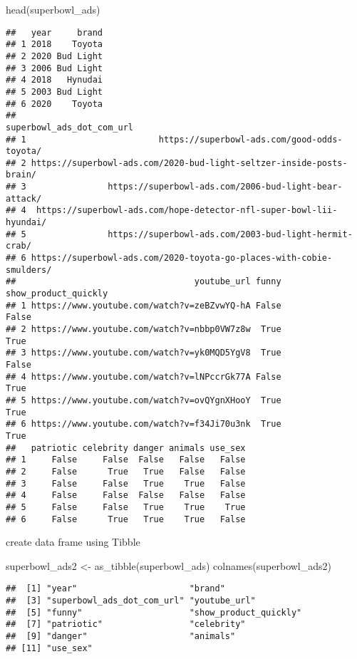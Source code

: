 \documentclass[
]{article}
\newenvironment{Shaded}{\begin{snugshade}}{\end{snugshade}}
\newcommand{\FunctionTok}[1]{\textcolor[rgb]{0.00,0.00,0.00}{#1}}
\newcommand{\NormalTok}[1]{#1}
\newcommand{\OtherTok}[1]{\textcolor[rgb]{0.56,0.35,0.01}{#1}}
\begin{document}
\begin{Shaded}
\begin{Highlighting}[]
\FunctionTok{head}\NormalTok{(superbowl\_ads)}
\end{Highlighting}
\end{Shaded}

\begin{verbatim}
##   year     brand
## 1 2018    Toyota
## 2 2020 Bud Light
## 3 2006 Bud Light
## 4 2018   Hynudai
## 5 2003 Bud Light
## 6 2020    Toyota
##                                              superbowl_ads_dot_com_url
## 1                          https://superbowl-ads.com/good-odds-toyota/
## 2 https://superbowl-ads.com/2020-bud-light-seltzer-inside-posts-brain/
## 3                https://superbowl-ads.com/2006-bud-light-bear-attack/
## 4  https://superbowl-ads.com/hope-detector-nfl-super-bowl-lii-hyundai/
## 5                https://superbowl-ads.com/2003-bud-light-hermit-crab/
## 6 https://superbowl-ads.com/2020-toyota-go-places-with-cobie-smulders/
##                                   youtube_url funny show_product_quickly
## 1 https://www.youtube.com/watch?v=zeBZvwYQ-hA False                False
## 2 https://www.youtube.com/watch?v=nbbp0VW7z8w  True                 True
## 3 https://www.youtube.com/watch?v=yk0MQD5YgV8  True                False
## 4 https://www.youtube.com/watch?v=lNPccrGk77A False                 True
## 5 https://www.youtube.com/watch?v=ovQYgnXHooY  True                 True
## 6 https://www.youtube.com/watch?v=f34Ji70u3nk  True                 True
##   patriotic celebrity danger animals use_sex
## 1     False     False  False   False   False
## 2     False      True   True   False   False
## 3     False     False   True    True   False
## 4     False     False  False   False   False
## 5     False     False   True    True    True
## 6     False      True   True    True   False
\end{verbatim}

create data frame using Tibble

\begin{Shaded}
\begin{Highlighting}[]
\NormalTok{superbowl\_ads2 }\OtherTok{\textless{}{-}} \FunctionTok{as\_tibble}\NormalTok{(superbowl\_ads)}
\FunctionTok{colnames}\NormalTok{(superbowl\_ads2)}
\end{Highlighting}
\end{Shaded}

\begin{verbatim}
##  [1] "year"                      "brand"                    
##  [3] "superbowl_ads_dot_com_url" "youtube_url"              
##  [5] "funny"                     "show_product_quickly"     
##  [7] "patriotic"                 "celebrity"                
##  [9] "danger"                    "animals"                  
## [11] "use_sex"
\end{verbatim}
\end{document}
